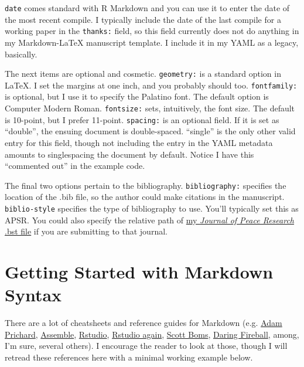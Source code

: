 \documentclass[11pt,]{article}
\begin{document}
\texttt{date} comes standard with R Markdown and you can use it to enter
the date of the most recent compile. I typically include the date of the
last compile for a working paper in the \texttt{thanks:} field, so this
field currently does not do anything in my Markdown-LaTeX manuscript
template. I include it in my YAML as a legacy, basically.

The next items are optional and cosmetic. \texttt{geometry:} is a
standard option in LaTeX. I set the margins at one inch, and you
probably should too. \texttt{fontfamily:} is optional, but I use it to
specify the Palatino font. The default option is Computer Modern Roman.
\texttt{fontsize:} sets, intuitively, the font size. The default is
10-point, but I prefer 11-point. \texttt{spacing:} is an optional field.
If it is set as ``double'', the ensuing document is double-spaced.
``single'' is the only other valid entry for this field, though not
including the entry in the YAML metadata amounts to singlespacing the
document by default. Notice I have this ``commented out'' in the example
code.

The final two options pertain to the bibliography.
\texttt{bibliography:} specifies the location of the .bib file, so the
author could make citations in the manuscript. \texttt{biblio-style}
specifies the type of bibliography to use. You'll typically set this as
APSR. You could also specify the relative path of
\href{http://svmiller.com/miscellany/journal-of-peace-research-bst-file/}{my
\emph{Journal of Peace Research} .bst file} if you are submitting to
that journal.

\section{Getting Started with Markdown
Syntax}\label{getting-started-with-markdown-syntax}

There are a lot of cheatsheets and reference guides for Markdown (e.g.
\href{https://github.com/adam-p/markdown-here/wiki/Markdown-Cheatsheet}{Adam
Prichard},
\href{http://assemble.io/docs/Cheatsheet-Markdown.html}{Assemble},
\href{https://www.rstudio.com/wp-content/uploads/2015/02/rmarkdown-cheatsheet.pdf}{Rstudio},
\href{https://www.rstudio.com/wp-content/uploads/2015/03/rmarkdown-reference.pdf}{Rstudio
again},
\href{http://scottboms.com/downloads/documentation/markdown_cheatsheet.pdf}{Scott
Boms}, \href{https://daringfireball.net/projects/markdown/syntax}{Daring
Fireball}, among, I'm sure, several others). I encourage the reader to
look at those, though I will retread these references here with a
minimal working example below.
\end{document}
